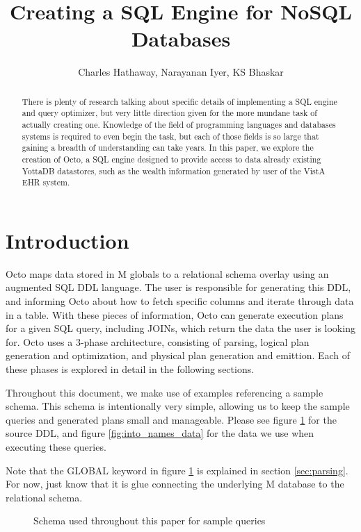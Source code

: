 \documentclass[]{article}
\title{Creating a SQL Engine for NoSQL Databases}
\author{Charles Hathaway, Narayanan Iyer, KS Bhaskar}
\begin{document}
\maketitle

\begin{abstract}
	
	There is plenty of research talking about specific details of implementing a SQL engine and query optimizer, but very little direction given for the more mundane task of actually creating one.
	Knowledge of the field of programming languages and databases systems is required to even begin the task, but each of those fields is so large that gaining a breadth of understanding can take years.
	In this paper, we explore the creation of Octo, a SQL engine designed to provide access to data already existing YottaDB datastores, such as the wealth information generated by user of the VistA EHR system.

\end{abstract}

\section{Introduction}

Octo maps data stored in M globals to a relational schema overlay using an augmented SQL DDL language.
The user is responsible for generating this DDL, and informing Octo about how to fetch specific columns and iterate through data in a table.
With these pieces of information, Octo can generate execution plans for a given SQL query, including JOINs, which return the data the user is looking for.
Octo uses a 3-phase architecture, consisting of parsing, logical plan generation and optimization, and physical plan generation and emittion.
Each of these phases is explored in detail in the following sections.

Throughout this document, we make use of examples referencing a sample schema.
This schema is intentionally very simple, allowing us to keep the sample queries and generated plans small and manageable.
Please see figure \ref{fig:intro_names_schema} for the source DDL, and figure \ref{fig:into_names_data} for the data we use when executing these queries.

Note that the GLOBAL keyword in figure \ref{fig:intro_names_schema} is explained in section \ref{sec:parsing}.
For now, just know that it is glue connecting the underlying M database to the relational schema.

\begin{figure}
	
	\caption{Schema used throughout this paper for sample queries}
	\label{fig:intro_names_schema}
\end{figure}
\end{document}
